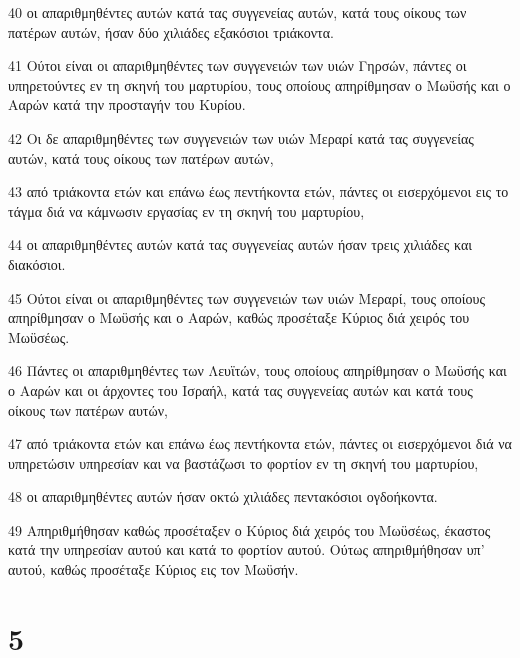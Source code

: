 \par 40 οι απαριθμηθέντες αυτών κατά τας συγγενείας αυτών, κατά τους οίκους των πατέρων αυτών, ήσαν δύο χιλιάδες εξακόσιοι τριάκοντα.
\par 41 Ούτοι είναι οι απαριθμηθέντες των συγγενειών των υιών Γηρσών, πάντες οι υπηρετούντες εν τη σκηνή του μαρτυρίου, τους οποίους απηρίθμησαν ο Μωϋσής και ο Ααρών κατά την προσταγήν του Κυρίου.
\par 42 Οι δε απαριθμηθέντες των συγγενειών των υιών Μεραρί κατά τας συγγενείας αυτών, κατά τους οίκους των πατέρων αυτών,
\par 43 από τριάκοντα ετών και επάνω έως πεντήκοντα ετών, πάντες οι εισερχόμενοι εις το τάγμα διά να κάμνωσιν εργασίας εν τη σκηνή του μαρτυρίου,
\par 44 οι απαριθμηθέντες αυτών κατά τας συγγενείας αυτών ήσαν τρεις χιλιάδες και διακόσιοι.
\par 45 Ούτοι είναι οι απαριθμηθέντες των συγγενειών των υιών Μεραρί, τους οποίους απηρίθμησαν ο Μωϋσής και ο Ααρών, καθώς προσέταξε Κύριος διά χειρός του Μωϋσέως.
\par 46 Πάντες οι απαριθμηθέντες των Λευϊτών, τους οποίους απηρίθμησαν ο Μωϋσής και ο Ααρών και οι άρχοντες του Ισραήλ, κατά τας συγγενείας αυτών και κατά τους οίκους των πατέρων αυτών,
\par 47 από τριάκοντα ετών και επάνω έως πεντήκοντα ετών, πάντες οι εισερχόμενοι διά να υπηρετώσιν υπηρεσίαν και να βαστάζωσι το φορτίον εν τη σκηνή του μαρτυρίου,
\par 48 οι απαριθμηθέντες αυτών ήσαν οκτώ χιλιάδες πεντακόσιοι ογδοήκοντα.
\par 49 Απηριθμήθησαν καθώς προσέταξεν ο Κύριος διά χειρός του Μωϋσέως, έκαστος κατά την υπηρεσίαν αυτού και κατά το φορτίον αυτού. Ούτως απηριθμήθησαν υπ' αυτού, καθώς προσέταξε Κύριος εις τον Μωϋσήν.

\chapter{5}

